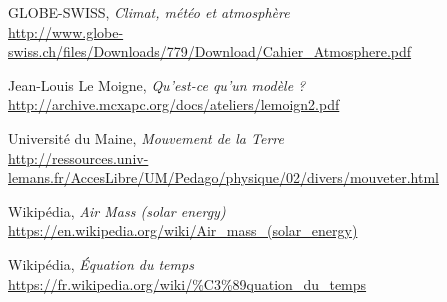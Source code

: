 \documentclass[12pt]{article}
\begin{document}
\begin{thebibliography}{99}
	GLOBE-SWISS,
	\emph{Climat, météo et atmosphère}\\
	\url{http://www.globe-swiss.ch/files/Downloads/779/Download/Cahier_Atmosphere.pdf}

	Jean-Louis Le Moigne,
	\emph{Qu'est-ce qu'un modèle ?}\\
	\url{http://archive.mcxapc.org/docs/ateliers/lemoign2.pdf}

	Université du Maine,
	\emph{Mouvement de la Terre}\\
	\url{http://ressources.univ-lemans.fr/AccesLibre/UM/Pedago/physique/02/divers/mouveter.html}

	Wikipédia,
	\emph{Air Mass (solar energy)}\\
	\url{https://en.wikipedia.org/wiki/Air_mass_(solar_energy)}

	Wikipédia,
	\emph{Équation du temps}\\
	\url{https://fr.wikipedia.org/wiki/%C3%89quation_du_temps}

\end{thebibliography}
\end{document}
